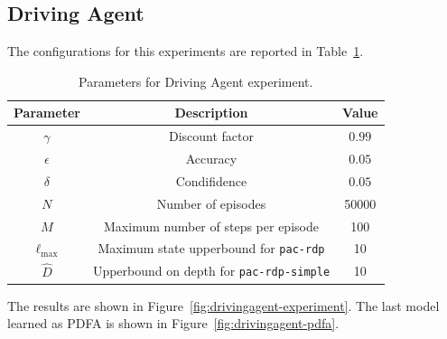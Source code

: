 \documentclass{article}
\begin{document}
\pagebreak


\subsection{Driving Agent}

The configurations for this experiments are reported in
Table~\ref{tab:drivingagent-params}.

\begin{table}[!h]
\centering
    \begin{tabular}{|c|c|c|}
 \hline
 Parameter & Description & Value \\ \hline \hline
 $\gamma$ & Discount factor & $0.99$\\ \hline
 $\epsilon$ & Accuracy & $0.05$\\ \hline
 $\delta$ & Condifidence & $0.05$\\ \hline
 $N$ & Number of episodes & 50000 \\ \hline
 $M$ & Maximum number of steps per episode & 100 \\ \hline
 $\ell_{\max}$ & Maximum state upperbound for \texttt{pac-rdp} & 10 \\ \hline
 $\hat{D}$ & Upperbound on depth for \texttt{pac-rdp-simple} & 10 \\ \hline
\end{tabular}
\caption{Parameters for Driving Agent experiment.}
\label{tab:drivingagent-params}
\end{table}

The results are shown in Figure~\ref{fig:drivingagent-experiment}.
The last model learned as PDFA is shown in Figure~\ref{fig:drivingagent-pdfa}.
\end{document}
